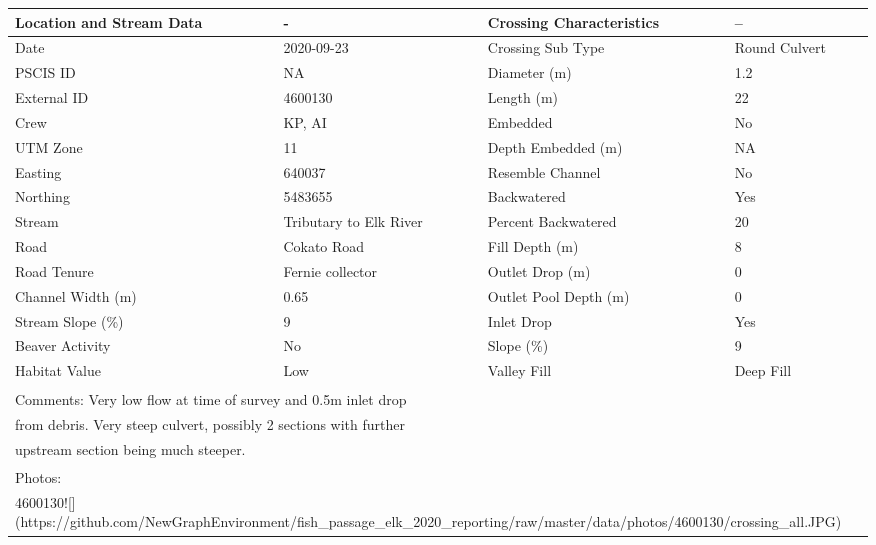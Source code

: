 \documentclass[
]{book}
\begin{document}
\begin{tabular}{l|l|l|l}
\hline
Location and Stream Data & - & Crossing Characteristics & --\\
\hline
Date & 2020-09-23 & Crossing Sub Type & Round Culvert\\
\hline
PSCIS ID & NA & Diameter (m) & 1.2\\
\hline
External ID & 4600130 & Length (m) & 22\\
\hline
Crew & KP, AI & Embedded & No\\
\hline
UTM Zone & 11 & Depth Embedded (m) & NA\\
\hline
Easting & 640037 & Resemble Channel & No\\
\hline
Northing & 5483655 & Backwatered & Yes\\
\hline
Stream & Tributary to Elk River & Percent Backwatered & 20\\
\hline
Road & Cokato Road & Fill Depth (m) & 8\\
\hline
Road Tenure & Fernie collector & Outlet Drop (m) & 0\\
\hline
Channel Width (m) & 0.65 & Outlet Pool Depth (m) & 0\\
\hline
Stream Slope (\%) & 9 & Inlet Drop & Yes\\
\hline
Beaver Activity & No & Slope (\%) & 9\\
\hline
Habitat Value & Low & Valley Fill & Deep Fill\\
\hline
\multicolumn{4}{l}{\textsuperscript{} Comments: Very low flow at time of survey and 0.5m inlet drop}\\
\multicolumn{4}{l}{from debris. Very steep culvert, possibly 2 sections with further}\\
\multicolumn{4}{l}{upstream section being much steeper.}\\
\multicolumn{4}{l}{\textsuperscript{} Photos:}\\
\multicolumn{4}{l}{4600130![](https://github.com/NewGraphEnvironment/fish\_passage\_elk\_2020\_reporting/raw/master/data/photos/4600130/crossing\_all.JPG)}\\
\end{tabular}
\end{document}

